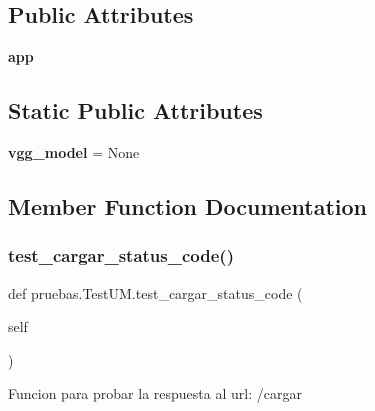 \subsection*{Public Attributes}
\begin{DoxyCompactItemize}
\item 
\mbox{\label{classpruebas_1_1_test_u_m_a3dcc06583ad34b984a1daa5ada38bb15}} 
{\bfseries app}
\end{DoxyCompactItemize}
\subsection*{Static Public Attributes}
\begin{DoxyCompactItemize}
\item 
\mbox{\label{classpruebas_1_1_test_u_m_adde7f78dcf948e48a407b7231f8a970f}} 
{\bfseries vgg\+\_\+model} = None
\end{DoxyCompactItemize}


\subsection{Member Function Documentation}
\mbox{\label{classpruebas_1_1_test_u_m_af0e1b161b7a46c48fe74e9cda7d5cd4c}} 
\subsubsection{\texorpdfstring{test\+\_\+cargar\+\_\+status\+\_\+code()}{test\_cargar\_status\_code()}}
{\footnotesize\ttfamily def pruebas.\+Test\+U\+M.\+test\+\_\+cargar\+\_\+status\+\_\+code (\begin{DoxyParamCaption}\item[{}]{self }\end{DoxyParamCaption})}

\begin{DoxyVerb}Funcion para probar la respuesta al url: /cargar
\end{DoxyVerb}
 \mbox{\label{classpruebas_1_1_test_u_m_aeb181c390d170aed40acc8de970abfe1}} 
